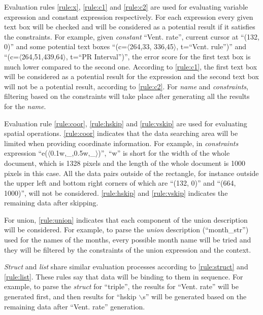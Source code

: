 Evaluation rules \ref{rule:x}, \ref{rule:c1} and \ref{rule:c2} are used 
for evaluating variable expression and constant expression respectively. 
For each expression every given text box will be checked and will be 
considered as a potential result if it satisfies the constraints. 
For example, given {\em constant} ``Vent. rate'', current cursor at ``(132, 0)'' and some potential text boxes ``(c=$\langle$264,33, 336,45$\rangle$, t=``Vcnt. rule'')'' and ``(c=$\langle$264,51,439,64$\rangle$, t=``PR Interval'')'', the error score for the first text box is much lower compared to the second one. According to \ref{rule:c1}, the first text box will be considered as a potential result 
for the expression and the second text box will not be a potential result, according to \ref{rule:c2}. For {\em name} and {\em constraints}, filtering based on the constraints will take place after generating all the results for the {\em name}. 

Evaluation rule \ref{rule:coor}, \ref{rule:hskip} and \ref{rule:vskip} 
are used for evaluating spatial operations. \ref{rule:coor} indicates that the data searching area 
will be limited when providing coordinate information. 
For example, in {\em constraints} expression ``e($\langle$0.1w,\_,0.5w,\_$\rangle$)'', ``w'' is short for the 
width of the whole document, which is 1328 pixels and the length of the whole document is 1000 pixels in this case. All the data pairs outside of 
the rectangle, for instance outside the upper left and bottom right corners of which are ``(132, 0)'' and ``(664, 1000)'', will not be considered. 
\ref{rule:hskip} and \ref{rule:vskip} 
indicates the remaining data after skipping. 

For union, \ref{rule:union} indicates that each component 
of the union description will be considered. For example, to parse the 
{\em union} description (``month\_str'') used for the names of the months, 
every possible month name will be tried and they will be filtered 
by the constraints of the union expression and the context. 

{\em Struct} and {\em list} share 
similar evaluation processes according to \ref{rule:struct} and \ref{rule:list}. These rules say 
that data will be binding to them in sequence. For example, to parse the {\em struct} for ``triple'', the results for ``Vent. rate'' will be generated first, and then results for ``hskip $\backslash$s'' will be generated based on the remaining data after ``Vent. rate'' generation. 

